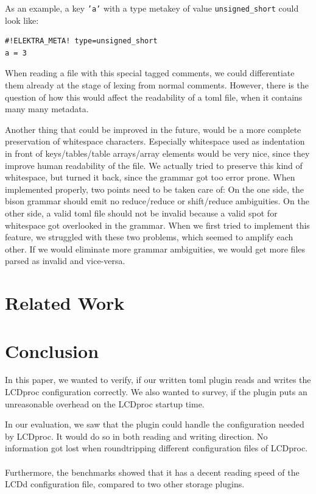 \documentclass[draft,final]{vutinfth} %
\begin{document}
As an example, a key \texttt{'a'} with a type metakey of value \texttt{unsigned\_short} could look like:
\begin{Verbatim}[frame=single, fontsize=\small]
#!ELEKTRA_META! type=unsigned_short
a = 3
\end{Verbatim}
When reading a file with this special tagged comments, we could differentiate them already at the stage of lexing from normal comments.
However, there is the question of how this would affect the readability of a \acrshort{toml} file, when it contains many many metadata.

Another thing that could be improved in the future, would be a more complete preservation of whitespace characters.
Especially whitespace used as indentation in front of keys/tables/table arrays/array elements would be very nice, since they improve human readability of the file.
We actually tried to preserve this kind of whitespace, but turned it back, since the grammar got too error prone.
When implemented properly, two points need to be taken care of:
On the one side, the bison grammar should emit no reduce/reduce or shift/reduce ambiguities.
On the other side, a valid \acrshort{toml} file should not be invalid because a valid spot for whitespace got overlooked in the grammar.
When we first tried to implement this feature, we struggled with these two problems, which seemed to amplify each other.
If we would eliminate more grammar ambiguities, we would get more files parsed as invalid and vice-versa.

\chapter{Related Work}

\chapter{Conclusion}
In this paper, we wanted to verify, if our written \acrshort{toml} plugin reads and writes the LCDproc configuration correctly.
We also wanted to survey, if the plugin puts an unreasonable overhead on the LCDproc startup time.

In our evaluation, we saw that the plugin could handle the configuration needed by LCDproc.
It would do so in both reading and writing direction.
No information got lost when roundtripping different configuration files of LCDproc.
\\\\
Furthermore, the benchmarks showed that it has a decent reading speed of the LCDd configuration file, compared to two other storage plugins.

\backmatter

\listoffigures

\listoftables


\printglossary[type=\acronymtype]

{}

\end{document}
